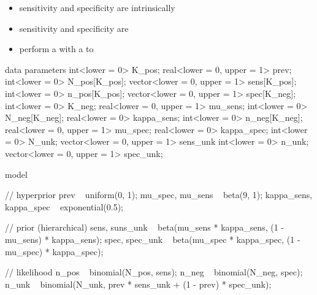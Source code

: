 \documentclass[10pt]{report}
\begin{document}
\begin{itemize}
\item sensitivity and specificity are intrinsically 
\item sensitivity and specificity are 
\item perform a  with a  to
\end{itemize}

{\small
\begin{stancode}
data {                             parameters {
  int<lower = 0> K_pos;              real<lower = 0, upper = 1> prev;
  int<lower = 0> N_pos[K_pos];       vector<lower = 0, upper = 1> sens[K_pos];
  int<lower = 0> n_pos[K_pos];       vector<lower = 0, upper = 1> spec[K_neg];
  int<lower = 0> K_neg;              real<lower = 0, upper = 1> mu_sens;
  int<lower = 0> N_neg[K_neg];       real<lower = 0> kappa_sens;
  int<lower = 0> n_neg[K_neg];       real<lower = 0, upper = 1> mu_spec;
                                     real<lower = 0> kappa_spec;
  int<lower = 0> N_unk;              vector<lower = 0, upper = 1> sens_unk
  int<lower = 0> n_unk;              vector<lower = 0, upper = 1> spec_unk;
}                                  }
\end{stancode}
}

{\small
\begin{stancode}
model {
  // hyperprior
  prev ~ uniform(0, 1);
  mu_spec, mu_sens ~ beta(9, 1);
  kappa_sens, kappa_spec ~ exponential(0.5);

  // prior (hierarchical)
  sens, suns_unk ~ beta(mu_sens * kappa_sens, (1 - mu_sens) * kappa_sens);
  spec, spec_unk ~ beta(mu_spec * kappa_spec, (1 - mu_spec) * kappa_spec);

  // likelihood
  n_pos ~ binomial(N_pos, sens);
  n_neg ~ binomial(N_neg, spec);
  n_unk ~ binomial(N_unk, prev * sens_unk + (1 - prev) * spec_unk);
}
\end{stancode}
}
\end{document}
